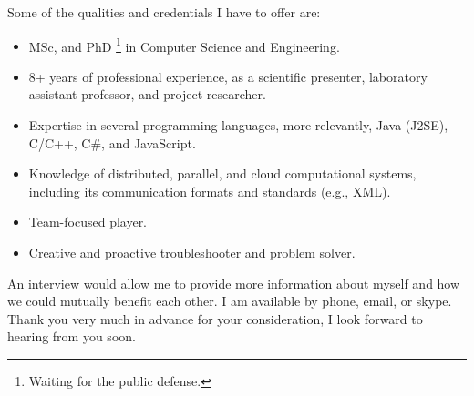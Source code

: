 \documentclass[11pt, a4paper]{awesome-cv}
\begin{document}
\begin{cvletter}
Some of the qualities and credentials I have to offer are:
\begin{itemize}
	\item MSc, and PhD \footnote{Waiting for the public defense.} in Computer Science and Engineering.
	\item 8+ years of professional experience, as a scientific presenter, laboratory assistant professor, and project researcher.
	\item Expertise in several programming languages, more relevantly, Java (J2SE), C/C++, C\#, and JavaScript.
	\item Knowledge of distributed, parallel, and cloud computational systems, including its communication formats and standards (e.g., XML).
	\item Team-focused player.	
	\item Creative and proactive troubleshooter and problem solver.
\end{itemize}



An interview would allow me to provide more information about myself and how we could mutually benefit each other.
I am available by phone, email, or skype.
Thank you very much in advance for your consideration, I look forward to hearing from you soon.

\end{cvletter}


\makeletterclosing
\end{document}
